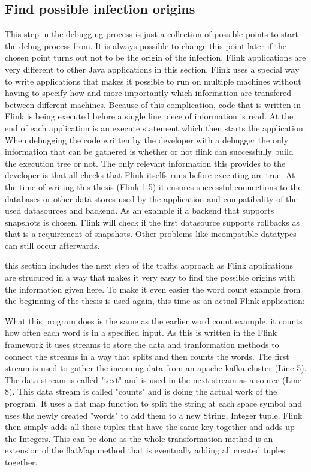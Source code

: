 \subsection{Find possible infection origins}
This step in the debugging process is just a collection of possible points to start the debug process from. It is always possible to change this point later if the chosen point turns out not to be the origin of the infection. Flink applications are very different to other Java applications in this section. Flink uses a special way to write applications that makes it possible to run on multiple machines without having to specify how and more importantly which information are transfered between different machines. Because of this complication, code that is written in Flink is being executed before a single line piece of information is read. At the end of each application is an execute statement which then starts the application. When debugging the code written by the developer with a debugger the only information that can be gathered is whether or not flink can successfully build the execution tree or not. The only relevant information this provides to the developer is that all checks that Flink itselfs runs before executing are true. At the time of writing this thesis (Flink 1.5) it ensures successful connections to the databases or other data stores used by the application and  compatibality of the used datasources and backend. As an example if a backend that supports snapshots is chosen, Flink will check if the first datasource supports rollbacks as that is a requirement of snapshots. Other problems like incompatible datatypes can still occur afterwards.

this section includes the next step of the traffic approach as Flink applications are strucured in a way that makes it very easy to find the possible origins with the information given here. To make it even easier the word count example from the beginning of the thesis is used again, this time as an actual Flink application:



What this program does is the same as the earlier word count example, it counts how often each word is in a specified input. As this is written in the Flink framework it uses streams to store the data and tranformation methods to connect the streams in a way that splits and then counts the words. The first stream is used to gather the incoming data from an apache kafka cluster (Line 5). The data stream is called "text" and is used in the next stream as a source (Line 8). This data stream is called "counts" and is doing the actual work of the program. It uses a flat map function to split the string at each space symbol and uses the newly created "words" to add them to a new String, Integer tuple. Flink then simply adds all these tuples that have the same key together and adds up the Integers. This can be done as the whole transformation method is an extension of the flatMap method that is eventually adding all created tuples together.

